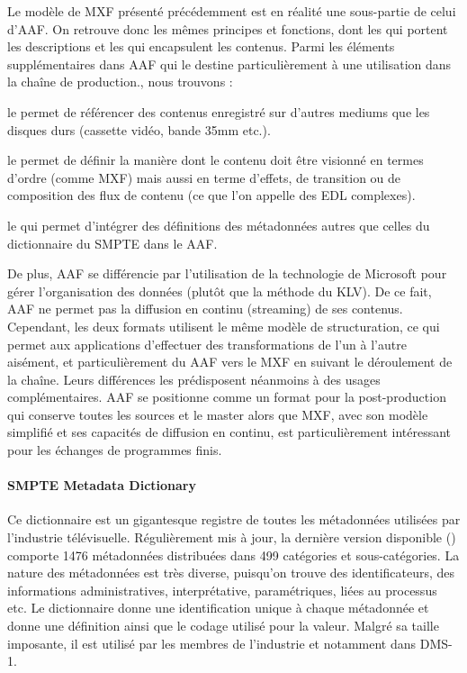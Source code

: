 Le modèle de MXF présenté précédemment est en réalité une sous-partie de celui d'AAF. 
On retrouve donc les mêmes principes et fonctions, dont les  qui portent les descriptions et les  qui encapsulent les contenus. 
Parmi les éléments supplémentaires dans AAF qui le destine particulièrement à une utilisation dans la chaîne de production., nous trouvons :
\begin{liste}
	\item le  permet de référencer des contenus enregistré sur d'autres mediums que les disques durs (cassette vidéo, bande 35mm etc.).

	\item le  permet de définir la manière dont le contenu doit être visionné en termes d'ordre (comme MXF) mais aussi en terme d'effets, de transition ou de composition des flux de contenu (ce que l'on appelle des EDL complexes).
	
	\item le  qui permet d'intégrer des définitions des métadonnées autres que celles du dictionnaire du SMPTE dans le AAF.
\end{liste}

De plus, AAF se différencie par l'utilisation de la technologie  de Microsoft pour gérer l'organisation des données (plutôt que la méthode du KLV).
De ce fait, AAF ne permet pas la diffusion en continu (streaming) de ses contenus.
Cependant, les deux formats utilisent le même modèle de structuration, ce qui permet aux applications d'effectuer des transformations de l'un à l'autre aisément, et particulièrement du AAF vers le MXF en suivant le déroulement de la chaîne.
Leurs différences les prédisposent néanmoins à des usages complémentaires. 
AAF se positionne comme un format pour la post-production qui conserve toutes les sources et le master alors que MXF, avec son modèle simplifié et ses capacités de diffusion en continu, est particulièrement intéressant pour les échanges de programmes finis.


\paragraph{SMPTE Metadata Dictionary}
Ce dictionnaire est un gigantesque registre de toutes les métadonnées utilisées par l'industrie télévisuelle. 
Régulièrement mis à jour, la dernière version disponible (\cite{SMPTE2010}) comporte 1476 métadonnées distribuées dans 499 catégories et sous-catégories.
La nature des métadonnées est très diverse, puisqu'on trouve des identificateurs, des informations administratives, interprétative, paramétriques, liées au processus etc.
Le dictionnaire donne une identification unique à chaque métadonnée et donne une définition ainsi que le codage utilisé pour la valeur. 
Malgré sa taille imposante, il est utilisé par les membres de l'industrie et notamment dans DMS-1.



